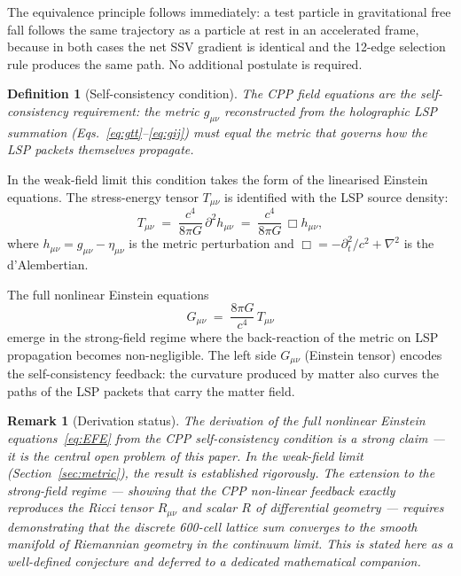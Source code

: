 \documentclass[12pt]{article}
\newtheorem{definition}[theorem]{Definition}
\newtheorem{remark}[theorem]{Remark}
\newcommand{\gmn}{g_{\mu\nu}}
\newcommand{\Gmn}{G_{\mu\nu}}
\newcommand{\Tmn}{T_{\mu\nu}}
\newcommand{\hmn}{h_{\mu\nu}}
\begin{document}
The equivalence principle follows immediately: a test particle in
gravitational free fall follows the same trajectory as a particle at
rest in an accelerated frame, because in both cases the net SSV
gradient is identical and the 12-edge selection rule produces the
same path.  No additional postulate is required.



\begin{definition}[Self-consistency condition]
The CPP field equations are the self-consistency requirement: the metric
$\gmn$ reconstructed from the holographic LSP summation
(Eqs.~\eqref{eq:gtt}--\eqref{eq:gij}) must equal the metric that governs
how the LSP packets themselves propagate.
\end{definition}

In the weak-field limit this condition takes the form of the linearised
Einstein equations.  The stress-energy tensor $\Tmn$ is identified with
the LSP source density:
\begin{equation}
  T_{\mu\nu} \;=\; \frac{c^4}{8\pi G}\,\partial^2\hmn
  \;=\; \frac{c^4}{8\pi G}\,\Box\hmn,
  \label{eq:EFE_linear}
\end{equation}
where $\hmn = \gmn - \eta_{\mu\nu}$ is the metric perturbation and
$\Box = -\partial_t^2/c^2 + \nabla^2$ is the d'Alembertian.

The full nonlinear Einstein equations
\begin{equation}
  \Gmn \;=\; \frac{8\pi G}{c^4}\,\Tmn
  \label{eq:EFE}
\end{equation}
emerge in the strong-field regime where the back-reaction of the metric
on LSP propagation becomes non-negligible.  The left side $\Gmn$ (Einstein
tensor) encodes the self-consistency feedback: the curvature produced by
matter also curves the paths of the LSP packets that carry the matter
field.

\begin{remark}[Derivation status]
The derivation of the full nonlinear Einstein equations~\eqref{eq:EFE}
from the CPP self-consistency condition is a \emph{strong claim} --- it is
the central open problem of this paper.  In the weak-field limit
(Section~\ref{sec:metric}), the result is established rigorously.
The extension to the strong-field regime --- showing that the CPP
non-linear feedback exactly reproduces the Ricci tensor $R_{\mu\nu}$ and
scalar $R$ of differential geometry --- requires demonstrating that the
discrete 600-cell lattice sum converges to the smooth manifold of
Riemannian geometry in the continuum limit.  This is stated here as a
well-defined conjecture and deferred to a dedicated mathematical companion.
\end{remark}
\end{document}
